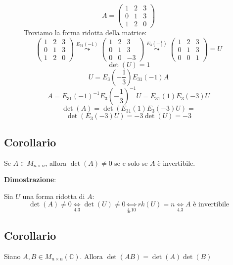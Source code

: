 \documentclass[a4paper]{article}
\theoremstyle{break}
\theoremstyle{break}
\theoremstyle{break}
\theoremstyle{break}
\begin{document}
\begin{figure}[H]
  \begin{example}
    \[
    A = \begin{pmatrix}
      1 & 2 & 3\\
      0 & 1 & 3\\
      1 & 2 & 0
    \end{pmatrix} 
    \] 
    Troviamo la forma ridotta della matrice:
    \[
    \begin{pmatrix} 
      1 & 2 & 3\\
      0 & 1 & 3\\
      1 & 2 & 0
    \end{pmatrix} 
    \stackrel{E_{31}(-1)}{\leadsto}
    \begin{pmatrix} 
      1 & 2 & 3\\
      0 & 1 & 3\\
      0 & 0 & -3
    \end{pmatrix}
    \stackrel{E_3(-\frac{1}{3})}{\leadsto}
    \begin{pmatrix} 
      1 & 2 & 3\\
      0 & 1 & 3\\
      0 & 0 & 1
    \end{pmatrix} = U
    \] 
    \[
    \det(U) = 1
    \] 
    \[
      U = E_3(-\frac{1}{3})E_{31}(-1)A
    \] 
    \[
      A = E_{31}(-1)^{-1}E_3(-\frac{1}{3})^{-1}U = E_{31}(1)E_3(-3)U
    \] 
    \[
    \det(A) = \det(E_{31}(1)E_3(-3)U) = 
    \] 
    \[
    \det(E_3(-3)U) = -3\det(U) = -3
    \] 
  \end{example}
\end{figure}

\subsection{Corollario}
Se \( A \in M_{n \times n} \), allora \( \det(A) \neq 0 \) se e solo se \( A \) è
invertibile.

\vspace{1em}
\noindent \textbf{Dimostrazione}:

Sia \( U \) una forma ridotta di \( A \):
\[
  \det(A) \neq 0 \underset{4.3}{\Leftrightarrow} \det(U) \neq 0 \underset{4.10}{\Leftrightarrow} rk(U) = n
  \underset{4.3}{\Leftrightarrow} A \text{ è invertibile}
\] 
\[
\square
\] 
\subsection{Corollario}
\label{4.13}
Siano \( A,B \in M_{n \times n}(\mathbb{C}) \). Allora \( \det(AB) = \det(A) \det(B) \) 
\end{document}
